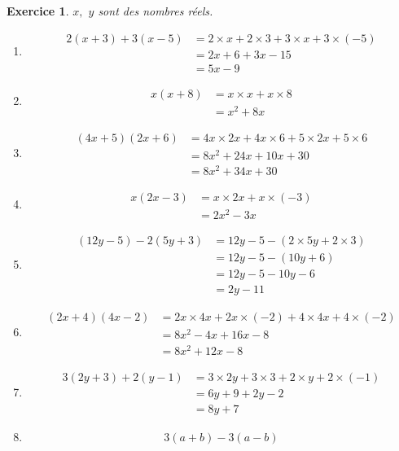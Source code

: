 \documentclass[10pt]{article}
\newtheorem{exo}{Exercice}
\begin{document}
\begin{exo}

$x,$ $y$ sont des nombres réels.

\setlength{\columnseprule}{0.5pt}

\begin{multicols}{2}
\begin{enumerate}
\item \begin{align*}2(x+3)+3(x-5)
&=2\times x+2\times 3+3\times x+3\times (-5)\\
&=2x+6+3x-15\\
&=5x-9
\end{align*}
\item \begin{align*}x(x+8)
&=x\times x+x\times 8\\
&=x^2+8x
\end{align*}
\item \begin{align*}
(4x+5)(2x+6)
&=4x\times 2x+4x\times 6+5\times 2x+5\times 6\\
&=8x^2+24x+10x+30\\
&=8x^2+34x+30
\end{align*}
\item \begin{align*}
x(2x-3)
&=x\times 2x+x\times (-3)\\
&=2x^2-3x
\end{align*}
\item \begin{align*}
(12y-5)-2(5y+3)
&=12y-5-\left(2\times 5y+2\times 3\right)\\
&=12y-5-\left(10y+6\right)\\
&=12y-5-10y-6\\&=2y-11
\end{align*}
\item \begin{align*}(2x+4)(4x-2)
&=2x\times 4x+2x\times (-2)+4\times 4x+4\times (-2)\\
&=8x^2-4x+16x-8\\
&=8x^2+12x-8
\end{align*}
\item \begin{align*}3(2y+3)+2(y-1)
&=3\times 2y+3\times 3+2\times y+2\times (-1)\\
&=6y+9+2y-2\\
&=8y+7
\end{align*}
\item \begin{align*}3(a+b)-3(a-b)

\end{align*}
\end{enumerate}
\end{multicols}
\end{exo}
\end{document}
